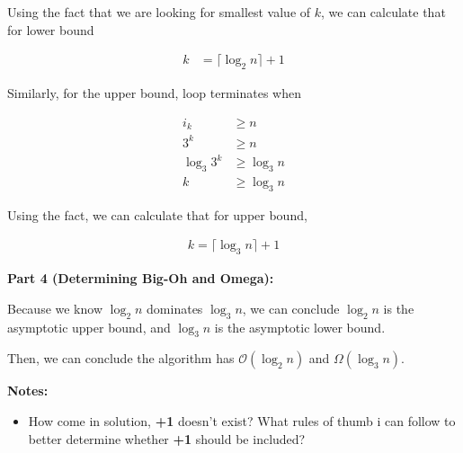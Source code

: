 \documentclass[12pt]{article}
\begin{document}
\begin{enumerate}[a.]
    \bigskip

    Using the fact that we are looking for smallest value of $k$, we can calculate that
    for lower bound

    \begin{align}
        k &= \lceil \log_2 n \rceil + 1
    \end{align}

    \bigskip

    Similarly, for the upper bound, loop terminates when

    \begin{align}
        i_k &\geq n\\
        3^k &\geq n\\
        \log_3 3^k &\geq \log_3 n\\
        k &\geq \log_3 n
    \end{align}

    \bigskip

    Using the fact, we can calculate that for upper bound,

    \begin{align}
        k = \lceil \log_3 n \rceil + 1
    \end{align}

    \textbf{Part 4 (Determining Big-Oh and Omega):}

    \bigskip

    Because we know $\log_2 n$ dominates $\log_3 n$, we can conclude
    $\log_2 n$ is the asymptotic upper bound, and $\log_3 n$ is the asymptotic lower bound.

    \bigskip

    Then, we can conclude the algorithm has $\mathcal{O}(\log_2 n)$ and $\Omega(\log_3 n)$.

    \bigskip

    \textbf{Notes:}

    \begin{itemize}
        \item How come in solution, \textbf{+1} doesn't exist? What rules of thumb
        i can follow to better determine whether \textbf{+1} should be included?
    \end{itemize}

\end{enumerate}
\end{document}
